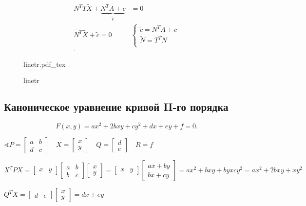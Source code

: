 \documentclass{book}
\newcommand{\tl}[1]{\widetilde{#1}}
\theoremstyle{definition}
\newcommand{\incfig}[1]{%
    \def\svgwidth{\columnwidth}
    {#1.pdf_tex}
}
\begin{document}
 \begin{align*}
     N^TT\tl X + \underbrace{N^TA + c}\limits_{\tl c}  &= 0\\
     \tl{N^T}\tl X + \tl c = 0&\begin{cases}
         \tl c = N^TA+c\\
         \tl N = T^TN\\
     \end{cases}\\
.\end{align*}

\begin{figure}[ht]
    \centering
    \incfig{linetr}
    \caption{linetr}
    \label{fig:linetr}
\end{figure}

\subsection{Каноническое уравнение кривой II-го порядка}

\[
    F(x,y) = ax^2 + 2bxy+cy^2+dx+ey+f = 0
.\] 

$\sphericalangle P = \begin{bmatrix} a &b\\d&c \end{bmatrix} \quad X = \begin{bmatrix} x\\y \end{bmatrix} \quad Q = \begin{bmatrix} d\\e \end{bmatrix} \quad R = f$

$X^TPX = \begin{bmatrix} x&y \end{bmatrix} \begin{bmatrix} a&b\\b&c \end{bmatrix} \begin{bmatrix} x\\y \end{bmatrix}  = \begin{bmatrix} x&y \end{bmatrix} \begin{bmatrix} ax+by\\bx+cy \end{bmatrix}  = ax^2+bxy+byxcy^2 = ax^2+2bxy+xy^2$

$Q^TX = \begin{bmatrix} d&e \end{bmatrix} \begin{bmatrix} x\\y \end{bmatrix}  = dx+ey$
\end{document}
